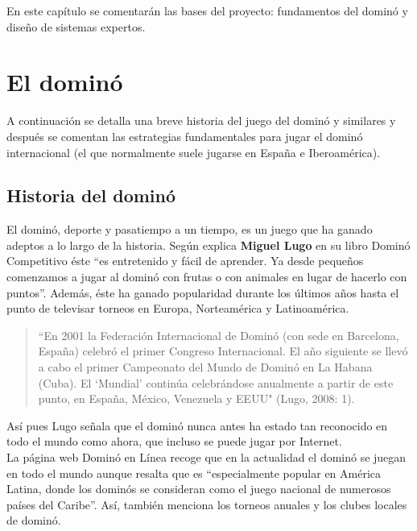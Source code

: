 

En este capítulo se comentarán las bases del proyecto: fundamentos del dominó y diseño de sistemas expertos.

\section{El dominó}

A continuación se detalla una breve historia del juego del dominó y similares y después se comentan las estrategias fundamentales para jugar el dominó internacional (el que normalmente suele jugarse en España e Iberoamérica).

\subsection{Historia del dominó}

El dominó, deporte y pasatiempo a un tiempo, es un juego que ha ganado adeptos a lo largo de la historia. Según explica \textbf{Miguel Lugo} en su libro Dominó Competitivo \cite{lugo08} éste “es entretenido y fácil de
aprender. Ya desde pequeños comenzamos a jugar al dominó con frutas o con animales en lugar de hacerlo
con puntos”. Además, éste ha ganado popularidad durante los últimos años hasta el punto de televisar
torneos en Europa, Norteamérica y Latinoamérica.

\begin{quote}
“En 2001 la Federación Internacional de Dominó (con sede en Barcelona, España) celebró el primer
Congreso Internacional. El año siguiente se llevó a cabo el primer Campeonato del Mundo de Dominó en La
Habana (Cuba). El ‘Mundial’ continúa celebrándose anualmente a partir de este punto, en España, México,
Venezuela y EEUU" (Lugo, 2008: 1).
\end{quote}

Así pues Lugo señala que el dominó nunca antes ha estado tan reconocido en todo el mundo como ahora, que
incluso se puede jugar por Internet. \\

La página web Dominó en Línea \cite{website:dominoenlinea} recoge que en la actualidad el dominó se juegan en todo el
mundo aunque resalta que es “especialmente popular en América Latina, donde los dominós se consideran
como el juego nacional de numerosos países del Caribe”. Así, también menciona los torneos anuales y
los clubes locales de dominó.

